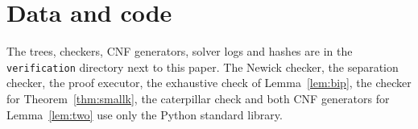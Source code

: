 \documentclass[11pt]{amsart}
\theoremstyle{remark}
\begin{document}
\section*{Data and code}
The trees, checkers, CNF generators, solver logs and hashes are in the \texttt{verification} directory next to this paper. The Newick checker, the separation checker, the proof executor, the exhaustive check of Lemma~\ref{lem:bip}, the checker for Theorem~\ref{thm:smallk}, the caterpillar check and both CNF generators for Lemma~\ref{lem:two} use only the Python standard library.



\end{document}
